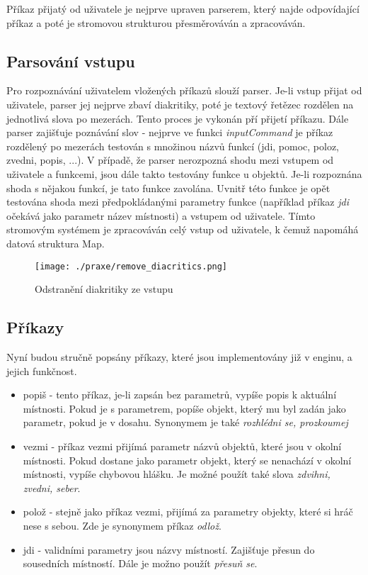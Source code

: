 \documentclass[main.tex]{subfiles}
\begin{document}
Příkaz přijatý od uživatele je nejprve upraven parserem, který najde odpovídající příkaz a poté je stromovou strukturou přesměrováván a zpracováván.

\subsection{Parsování vstupu}
Pro rozpoznávání uživatelem vložených příkazů slouží parser. Je-li vstup přijat od uživatele, parser jej nejprve zbaví diakritiky, poté je textový řetězec rozdělen na jednotlivá slova po mezerách. Tento proces je vykonán pří přijetí příkazu. Dále parser zajišťuje poznávání slov - nejprve ve funkci \textit{inputCommand} je příkaz rozdělený po mezerách testován s množinou názvů funkcí (jdi, pomoc, poloz, zvedni, popis, ...). V případě, že parser nerozpozná shodu mezi vstupem od uživatele a funkcemi, jsou dále takto testovány funkce u objektů. Je-li rozpoznána shoda s nějakou funkcí, je tato funkce zavolána. Uvnitř této funkce je opět testována shoda mezi předpokládanými parametry funkce (například příkaz \textit{jdi} očekává jako parametr název místnosti) a vstupem od uživatele. Tímto stromovým systémem je zpracováván celý vstup od uživatele, k čemuž napomáhá datová struktura Map.

		\begin{figure}[h]
			\centering
			\texttt{[image: ./praxe/remove\_diacritics.png]}
			\caption{Odstranění diakritiky ze vstupu}
		\end{figure}
\subsection{Příkazy}
Nyní budou stručně popsány příkazy, které jsou implementovány již v enginu, a jejich funkčnost.
\begin{itemize}
    \item popiš - tento příkaz, je-li zapsán bez parametrů, vypíše popis k aktuální místnosti. Pokud je s parametrem, popíše objekt, který mu byl zadán jako parametr, pokud je v dosahu. Synonymem je také \textit{rozhlédni se, prozkoumej}
    \item vezmi - příkaz vezmi přijímá parametr názvů objektů, které jsou v okolní místnosti. Pokud dostane jako parametr objekt, který se nenachází v okolní místnosti, vypíše chybovou hlášku. Je možné použít také slova \textit{zdvihni, zvedni, seber}.  
    \item polož - stejně jako příkaz vezmi, přijímá za parametry objekty, které si hráč nese s sebou. Zde je synonymem příkaz \textit{odlož}. 
    \item jdi - validními parametry jsou názvy místností. Zajišťuje přesun do sousedních místností. Dále je možno použít \textit{přesuň se}. 
\end{itemize}
\end{document}
